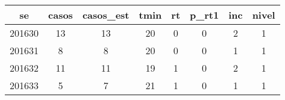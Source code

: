\begin{tabular}{c|ccccccc}
  \hline
se & casos & casos\_est & tmin & rt & p\_rt1 & inc & nivel \\ 
  \hline
201630 & 13 & 13 & 20 & 0 & 0 & 2 & 1 \\ 
  201631 & 8 & 8 & 20 & 0 & 0 & 1 & 1 \\ 
  201632 & 11 & 11 & 19 & 1 & 0 & 2 & 1 \\ 
  201633 & 5 & 7 & 21 & 1 & 0 & 1 & 1 \\ 
   \hline
\end{tabular}
